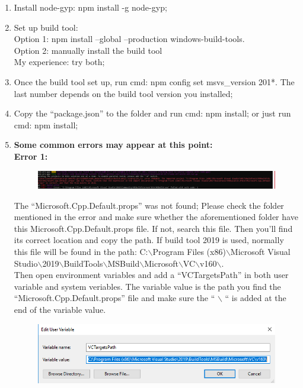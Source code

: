 \documentclass{article}
\begin{document}
\begin{enumerate}
  \item Install node-gyp: npm install -g node-gyp;
  \item Set up build tool:\\ Option 1: npm install --global --production windows-build-tools.\\
  Option 2: manually install the build tool\\
  My experience: try both;
  \item Once the build tool set up, run cmd: npm config set msvs\_version 201*. The last number depends on the build tool version you installed;
  \item Copy the “package.json” to the folder and run cmd: npm install; or just run cmd: npm install;
  \item \textbf{Some common errors may appear at this point:}\\
  \textbf{Error 1:}
  \FloatBarrier
    \begin{figure}[h!]
    \centering
    \includegraphics[scale=0.4]{error1.png}
    \label{fig:error1}
    \end{figure}
  \FloatBarrier
  The “Microsoft.Cpp.Default.props” was not found;
  Please check the folder mentioned in the error and make sure whether the aforementioned folder have this Microsoft.Cpp.Default.props file. If not, search this file. Then you’ll find its correct location and copy the path. If build tool 2019 is used, normally this file will be found in the path:
  C:$\backslash$Program Files (x86)$\backslash$Microsoft Visual Studio$\backslash$2019$\backslash$BuildTools$\backslash$MSBuild$\backslash$Microsoft$\backslash$VC$\backslash$v160$\backslash$.\\
  Then open environment variables and add a “VCTargetsPath” in both user variable and system veriables. The variable value is the path you find the “Microsoft.Cpp.Default.props” file and make sure the “ $\backslash$ “ is added at the end of the variable value.
  \FloatBarrier
    \begin{figure}[h!]
    \centering
    \includegraphics[scale=0.8]{vctargetspath.png}

\end{figure}
\end{enumerate}
\end{document}
